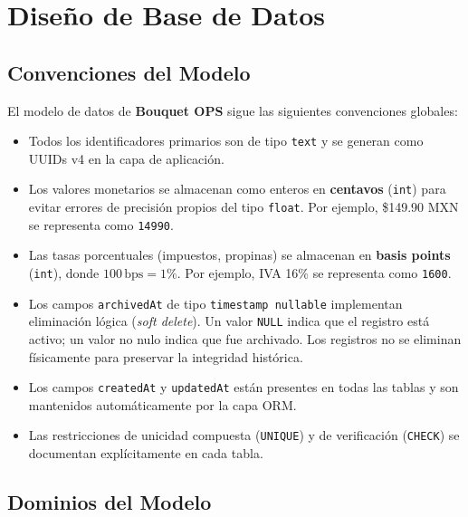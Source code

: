 \documentclass[12pt, letterpaper]{article}
\begin{document}

\section{Diseño de Base de Datos}

\subsection{Convenciones del Modelo}

El modelo de datos de \textbf{Bouquet OPS} sigue las siguientes convenciones globales:

\begin{itemize}
  \item Todos los identificadores primarios son de tipo \texttt{text} y se generan como UUIDs v4 en la capa de aplicación.
  \item Los valores monetarios se almacenan como enteros en \textbf{centavos} (\texttt{int}) para evitar errores de precisión propios del tipo \texttt{float}. Por ejemplo, \$149.90 MXN se representa como \texttt{14990}.
  \item Las tasas porcentuales (impuestos, propinas) se almacenan en \textbf{basis points} (\texttt{int}), donde $100\,\text{bps} = 1\%$. Por ejemplo, IVA 16\% se representa como \texttt{1600}.
  \item Los campos \texttt{archivedAt} de tipo \texttt{timestamp nullable} implementan eliminación lógica (\textit{soft delete}). Un valor \texttt{NULL} indica que el registro está activo; un valor no nulo indica que fue archivado. Los registros no se eliminan físicamente para preservar la integridad histórica.
  \item Los campos \texttt{createdAt} y \texttt{updatedAt} están presentes en todas las tablas y son mantenidos automáticamente por la capa ORM.
  \item Las restricciones de unicidad compuesta (\texttt{UNIQUE}) y de verificación (\texttt{CHECK}) se documentan explícitamente en cada tabla.
\end{itemize}

\subsection{Dominios del Modelo}
\end{document}
